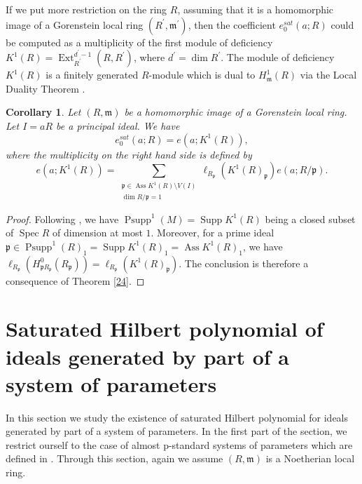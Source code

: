 \documentclass{amsart}
\newtheorem {corollary}[theorem]{Corollary}
\theoremstyle {definition}
\theoremstyle {remark}
\begin{document}
If we put more restriction on the ring $R$, assuming that it is a homomorphic image of a Gorenstein local ring $(R^\prime, {\ensuremath{\mathfrak m}}^\prime)$, then the coefficient $e_0^{sat}(a; R)$ could be computed as a multiplicity of the first module of deficiency $K^1(R)={\operatorname{Ext}}^{d^\prime-1}_{R^\prime}(R, R^\prime)$, where $d^\prime=\dim R^\prime$. The module of deficiency $K^1(R)$ is a finitely generated $R$-module which is dual to $H^1_{\ensuremath{\mathfrak m}}(R)$ via the Local Duality Theorem \cite[11.2.6]{BS}.

\begin{corollary}\label{26}
Let $(R, {\ensuremath{\mathfrak m}})$ be a homomorphic image of a Gorenstein local ring. Let $I=aR$ be a principal ideal. We have
$$e_0^{sat}(a; R)=e(a; K^1(R)),$$
where the multiplicity on the right hand side is defined by
$$e(a; K^1(R))=\sum_{\substack{{\ensuremath{\mathfrak p}}\in{\operatorname{Ass}} K^1(R)\setminus V(I)\\ \dim R/{\ensuremath{\mathfrak p}}=1}}\ell_{R_{\ensuremath{\mathfrak p}} }(K^1(R)_{\ensuremath{\mathfrak p}})e(a; R/{\ensuremath{\mathfrak p}}).$$
\end{corollary}
\begin{proof}
Following \cite[Proposition 1.2]{BS1}, we have ${\operatorname{Psupp}}^1(M)={\operatorname{Supp}} K^1(R)$ being a closed subset of ${\operatorname{Spec}} R$ of dimension at most $1$. Moreover, for a prime ideal ${\ensuremath{\mathfrak p}}\in {\operatorname{Psupp}}^1(R)_1={\operatorname{Supp}} K^1(R)_1={\operatorname{Ass}} K^1(R)_1$, we have
$\ell_{R_{\ensuremath{\mathfrak p}}}(H^0_{{\ensuremath{\mathfrak p}} R_{\ensuremath{\mathfrak p}}}(R_{\ensuremath{\mathfrak p}}))=\ell_{R_{\ensuremath{\mathfrak p}}}(K^1(R)_{\ensuremath{\mathfrak p}})$. The conclusion is therefore a consequence of Theorem \ref{24}.
\end{proof}

\section{Saturated Hilbert polynomial of ideals generated by part of a system of parameters}

In this section we study the existence of saturated Hilbert polynomial for ideals generated by part of a system of parameters. In the first part of the section, we restrict ourself to the case of almost p-standard systems of parameters which are defined in \cite{DTCNam}. Through this section, again we assume $(R, {\ensuremath{\mathfrak m}})$ is a Noetherian local ring.
\end{document}
